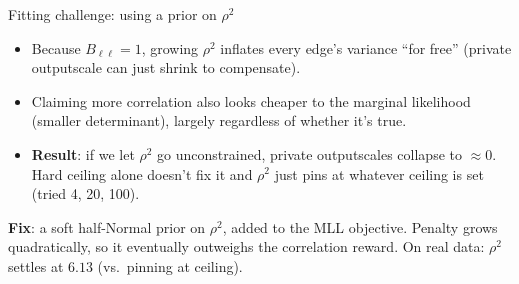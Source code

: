 \documentclass[11pt]{beamer}
\begin{document}
\begin{frame}{Fitting challenge: using a prior on $\rho^2$}
\begin{itemize}
    \item Because $B_{\ell\ell}=1$, growing $\rho^2$ inflates every edge's
    variance ``for free'' (private outputscale can just shrink to
    compensate).
    \item Claiming more correlation also looks cheaper to the marginal
    likelihood (smaller determinant), largely regardless of whether it's
    true.
    \item \textbf{Result}: if we let $\rho^2$ go unconstrained, private
    outputscales collapse to $\approx 0$. Hard ceiling alone doesn't fix
    it and $\rho^2$ just pins at whatever ceiling is set (tried 4, 20,
    100).
\end{itemize}
\vspace{0.3cm}
\textbf{Fix}: a soft half-Normal prior on $\rho^2$, added to the MLL
objective. Penalty grows quadratically, so it eventually outweighs the
correlation reward.
On real data: $\rho^2$ settles at $6.13$ (vs.\ pinning at ceiling).
\end{frame}
\end{document}
